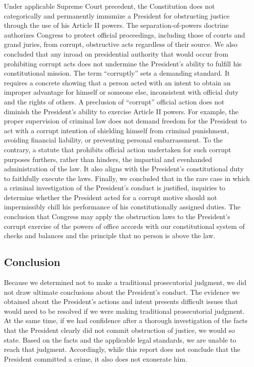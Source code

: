 Under applicable Supreme Court precedent, the Constitution does not categorically and permanently immunize a President for obstructing justice through the use of his Article II powers.
The separation-of-powers doctrine authorizes Congress to protect official proceedings, including those of courts and grand juries, from corrupt, obstructive acts regardless of their source.
We also concluded that any inroad on presidential authority that would occur from prohibiting corrupt acts does not undermine the President’s ability to fulfill his constitutional mission.
The term “corruptly” sets a demanding standard.
It requires a concrete showing that a person acted with an intent to obtain an improper advantage for himself or someone else, inconsistent with official duty and the rights of others.
A preclusion of “corrupt” official action does not diminish the President’s ability to exercise Article II powers.
For example, the proper supervision of criminal law does not demand freedom for the President to act with a corrupt intention of shielding himself from criminal punishment, avoiding financial liability, or preventing personal embarrassment.
To the contrary, a statute that prohibits official action undertaken for such corrupt purposes furthers, rather than hinders, the impartial and evenhanded administration of the law.
It also aligns with the President’s constitutional duty to faithfully execute the laws.
Finally, we concluded that in the rare case in which a criminal investigation of the President’s conduct is justified, inquiries to determine whether the President acted for a corrupt motive should not impermissibly chill his performance of his constitutionally assigned duties.
The conclusion that Congress may apply the obstruction laws to the President’s corrupt exercise of the powers of office accords with our constitutional system of checks and balances and the principle that no person is above the law.

\subsection*{Conclusion}

Because we determined not to make a traditional prosecutorial judgment, we did not draw ultimate conclusions about the President’s conduct.
The evidence we obtained about the President’s actions and intent presents difficult issues that would need to be resolved if we were making traditional prosecutorial judgment.
At the same time, if we had confidence after a thorough investigation of the facts that the President clearly did not commit obstruction of justice, we would so state.
Based on the facts and the applicable legal standards, we are unable to reach that judgment.
Accordingly, while this report does not conclude that the President committed a crime, it also does not exonerate him.
